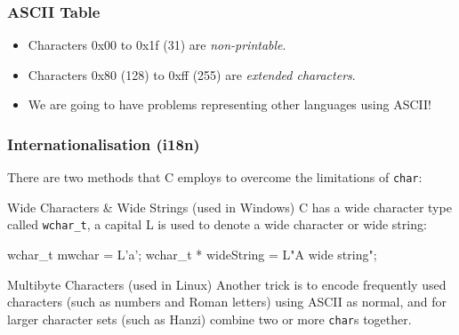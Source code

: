 \documentclass[table]{beamer}
\newif\ifschigh\schighfalse
\newcommand{\kw}[1]{\ifschigh\textcolor{red}{#1}\else\textcolor{keyword}{#1}\fi}
\newcommand{\kt}[1]{\ifschigh\textcolor{red}{#1}\else\textcolor{ctext}{#1}\fi}
\begin{document}
\begin{frame}[fragile]
\frametitle{ASCII Table}
\begin{itemize}
\item Characters 0x00 to 0x1f (31) are \emph{non-printable}.
\item Characters 0x80 (128) to 0xff (255) are \emph{extended characters}.
\item We are going to have problems representing other languages using ASCII!
\end{itemize}
\end{frame}

\begin{frame}[fragile]
\frametitle{Internationalisation (i18n)}
There are two methods that C employs to overcome the limitations of {\tt \kw{char}}:
\begin{block}{Wide Characters \& Wide Strings (used in Windows)}
C has a wide character type called {\tt \kw{wchar\_t}}, a capital L is used to denote a wide character or wide string:
\vspace{-0.1in}
\begin{semiverbatim}
\kw{wchar_t} mwchar = L\kt{'a'};
\kw{wchar_t} * wideString = L\kt{"A wide string"};
\end{semiverbatim}
\end{block}

\begin{block}{Multibyte Characters (used in Linux)}
Another trick is to encode frequently used characters (such as numbers and Roman letters) using ASCII as normal, and for larger character sets (such as Hanzi) combine two or more {\tt \kw{char}}s together.
\end{block}
\end{frame}
\end{document}

